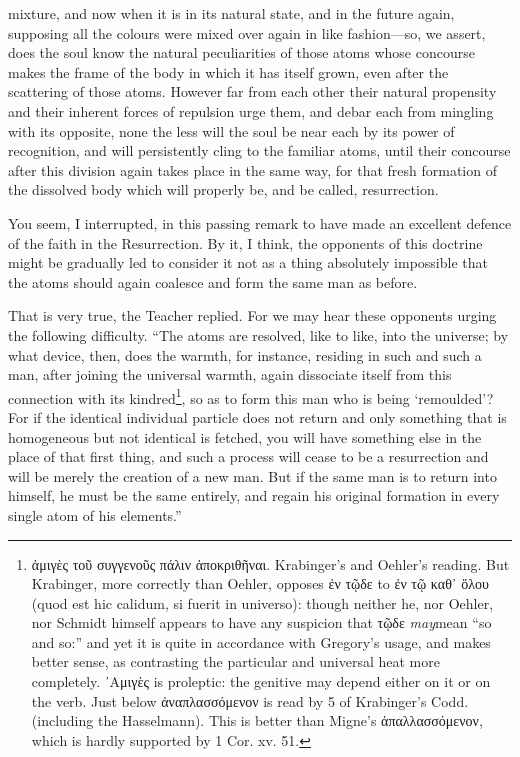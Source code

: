 mixture, and now when it is in its natural state, and in the future again, supposing all the colours were mixed over again in like fashion—so, we assert, does the soul know the natural peculiarities of those atoms whose concourse makes the frame of the body in which it has itself grown, even after the scattering of those atoms. However far from each other their natural propensity and their inherent forces of repulsion urge them, and debar each from mingling with its opposite, none the less will the soul be near each by its power of recognition, and will persistently cling to the familiar atoms, until their concourse after this division again takes place in the same way, for that fresh formation of the dissolved body which will properly be, and be called, resurrection.

You seem, I interrupted, in this passing remark to have made an excellent defence of the faith in the Resurrection. By it, I think, the opponents of this doctrine might be gradually led to consider it not as a thing absolutely impossible that the atoms should again coalesce and form the same man as before.

That is very true, the Teacher replied. For we may hear these opponents urging the following difficulty. “The atoms are resolved, like to like, into the universe; by what device, then, does the warmth, for instance, residing in such and such a man, after joining the universal warmth, again dissociate itself from this connection with its kindred\footnote{\textgreek{ἀμιγὲς τοῦ συγγενοῦς πάλιν ἀποκριθῆναι}. Krabinger’s and Oehler’s reading. But Krabinger, more correctly than Oehler, opposes \textgreek{ἐν τῷδε} to \textgreek{ἐν τῷ καθ᾽ ὅλου} (quod est hic calidum, si fuerit in universo): though neither he, nor Oehler, nor Schmidt himself appears to have any suspicion that \textgreek{τῷδε} \emph{may}mean “so and so:” and yet it is quite in accordance with Gregory’s usage, and makes better sense, as contrasting the particular and universal heat more completely. ᾽\textgreek{Αμιγὲς} is proleptic: the genitive may depend either on it or on the verb. Just below \textgreek{ἀναπλασσόμενον} is read by 5 of Krabinger’s Codd. (including the Hasselmann). This is better than Migne’s \textgreek{ἀπαλλασσόμενον}, which is hardly supported by 1 Cor. xv. 51.}, so as to form this man who is being ‘remoulded’? For if the identical individual particle does not return and only something that is homogeneous but not identical is fetched, you will have something else in the place of that first thing, and such a process will cease to be a resurrection and will be merely the creation of a new man. But if the same man is to return into himself, he must be the same entirely, and regain his original formation in every single atom of his elements.”

